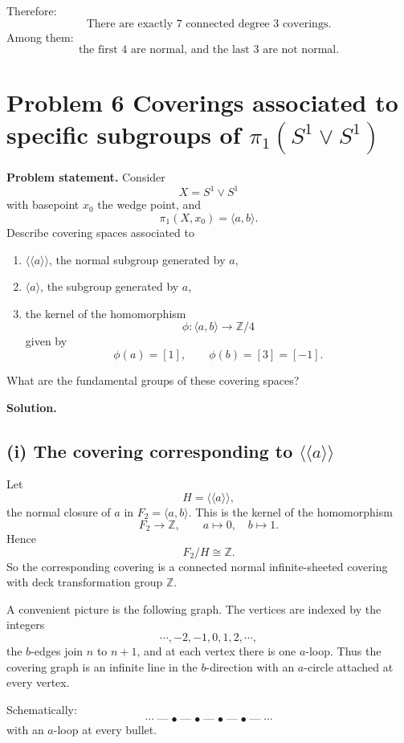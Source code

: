 \documentclass[12pt,a4paper]{article}
\theoremstyle{notespace}
\newcommand{\longdash}{\mathrel{\text{---}}}
\begin{document}
Therefore:
\[
\boxed{\text{There are exactly \(7\) connected degree \(3\) coverings.}}
\]
Among them:
\[
\boxed{\text{the first \(4\) are normal, and the last \(3\) are not normal.}}
\]

\bigskip

\section{Problem 6 Coverings associated to specific subgroups of \texorpdfstring{$\pi_1(S^1\vee S^1)$}{pi1(S1 vee S1)}}

\textbf{Problem statement.}
Consider
\[
X=S^1\vee S^1
\]
with basepoint \(x_0\) the wedge point, and
\[
\pi_1(X,x_0)=\langle a,b\rangle.
\]
Describe covering spaces associated to
\begin{enumerate}
	\item[(i)] \(\langle\!\langle a\rangle\!\rangle\), the normal subgroup generated by \(a\),
	\item[(ii)] \(\langle a\rangle\), the subgroup generated by \(a\),
	\item[(iii)] the kernel of the homomorphism
	\[
	\phi:\langle a,b\rangle\to \mathbb Z/4
	\]
	given by
	\[
	\phi(a)=[1],\qquad \phi(b)=[3]=[-1].
	\]
\end{enumerate}
What are the fundamental groups of these covering spaces?

\textbf{Solution.}

\subsection*{(i) The covering corresponding to \texorpdfstring{$\langle\!\langle a\rangle\!\rangle$}{<<a>>}}

Let
\[
H=\langle\!\langle a\rangle\!\rangle,
\]
the normal closure of \(a\) in \(F_2=\langle a,b\rangle\). This is the kernel of the homomorphism
\[
F_2\to \mathbb Z,\qquad a\mapsto 0,\quad b\mapsto 1.
\]
Hence
\[
F_2/H\cong \mathbb Z.
\]
So the corresponding covering is a connected normal infinite-sheeted covering with deck transformation group \(\mathbb Z\).

A convenient picture is the following graph. The vertices are indexed by the integers
\[
\cdots,-2,-1,0,1,2,\cdots,
\]
the \(b\)-edges join \(n\) to \(n+1\), and at each vertex there is one \(a\)-loop. Thus the covering graph is an infinite line in the \(b\)-direction with an \(a\)-circle attached at every vertex.

Schematically:
\[
\cdots \longdash \bullet \longdash \bullet \longdash \bullet \longdash \bullet \longdash \cdots
\]
with an \(a\)-loop at every bullet.
\end{document}
